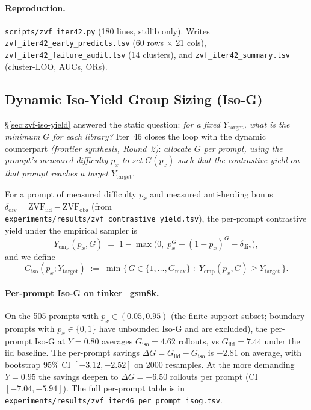 \documentclass{article}
\begin{document}
\paragraph{Reproduction.}
\texttt{scripts/zvf_iter42.py} (180 lines, stdlib only). Writes
\texttt{zvf_iter42_early_predicts.tsv} (60 rows $\times$ 21 cols),
\texttt{zvf_iter42_failure_audit.tsv} (14 clusters), and
\texttt{zvf_iter42_summary.tsv} (cluster-LOO, AUCs, ORs). 

\subsection{Dynamic Iso-Yield Group Sizing (Iso-G)}
\label{sec:zvf-isog}
\S\ref{sec:zvf-iso-yield} answered the static question: \emph{for a
fixed $Y_{\mathrm{target}}$, what is the minimum $G$ for each library?}
Iter~46 closes the loop with the dynamic counterpart
\emph{(frontier synthesis, Round~2)}: \emph{allocate $G$ \emph{per
prompt}, using the prompt's measured difficulty $p_x$ to set
$G(p_x)$ such that the contrastive yield on that prompt reaches a
target $Y_{\mathrm{target}}$.}

For a prompt of measured difficulty $p_x$ and measured anti-herding
bonus $\delta_{\mathrm{div}} = \mathrm{ZVF}_{\mathrm{iid}} -
\mathrm{ZVF}_{\mathrm{obs}}$ (from
\texttt{experiments/results/zvf_contrastive_yield.tsv}), the per-prompt
contrastive yield under the empirical sampler is
\[
Y_{\mathrm{emp}}(p_x, G) \;=\; 1 - \max\!\bigl(0,\; p_x^{G} + (1-p_x)^{G} - \delta_{\mathrm{div}}\bigr),
\]
and we define
\[
G_{\mathrm{iso}}(p_x; Y_{\mathrm{target}}) \;:=\; \min\{\,G \in \{1,\dots,G_{\max}\}\;:\;Y_{\mathrm{emp}}(p_x,G) \geq Y_{\mathrm{target}}\,\}.
\]

\paragraph{Per-prompt Iso-G on tinker\_gsm8k.}
On the 505 prompts with $p_x \in (0.05, 0.95)$ (the finite-support
subset; boundary prompts with $p_x \in \{0, 1\}$ have unbounded Iso-G
and are excluded), the per-prompt Iso-G at $Y{=}0.80$ averages
$\bar G_{\mathrm{iso}}{=}4.62$ rollouts, vs $\bar G_{\mathrm{iid}}{=}7.44$
under the iid baseline. The per-prompt savings
$\Delta G = G_{\mathrm{iid}} - G_{\mathrm{iso}}$ is
$\mathbf{-2.81}$ on average, with bootstrap 95\% CI $[-3.12, -2.52]$
on 2000 resamples. At the more demanding $Y{=}0.95$ the savings
deepen to $\Delta G = -6.50$ rollouts per prompt (CI $[-7.04, -5.94]$).
The full per-prompt table is in
\texttt{experiments/results/zvf_iter46_per_prompt_isog.tsv}.
\end{document}
